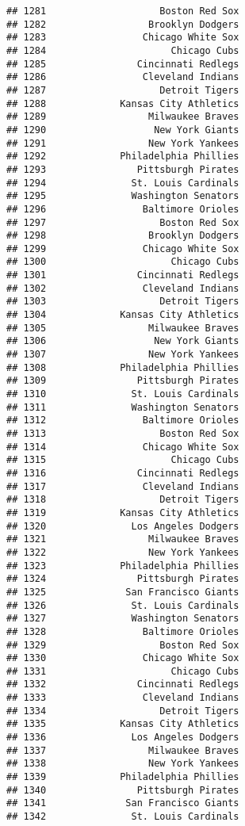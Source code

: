 \documentclass[]{article}
\begin{document}
\begin{verbatim}
## 1281                    Boston Red Sox
## 1282                  Brooklyn Dodgers
## 1283                 Chicago White Sox
## 1284                      Chicago Cubs
## 1285                Cincinnati Redlegs
## 1286                 Cleveland Indians
## 1287                    Detroit Tigers
## 1288             Kansas City Athletics
## 1289                  Milwaukee Braves
## 1290                   New York Giants
## 1291                  New York Yankees
## 1292             Philadelphia Phillies
## 1293                Pittsburgh Pirates
## 1294               St. Louis Cardinals
## 1295               Washington Senators
## 1296                 Baltimore Orioles
## 1297                    Boston Red Sox
## 1298                  Brooklyn Dodgers
## 1299                 Chicago White Sox
## 1300                      Chicago Cubs
## 1301                Cincinnati Redlegs
## 1302                 Cleveland Indians
## 1303                    Detroit Tigers
## 1304             Kansas City Athletics
## 1305                  Milwaukee Braves
## 1306                   New York Giants
## 1307                  New York Yankees
## 1308             Philadelphia Phillies
## 1309                Pittsburgh Pirates
## 1310               St. Louis Cardinals
## 1311               Washington Senators
## 1312                 Baltimore Orioles
## 1313                    Boston Red Sox
## 1314                 Chicago White Sox
## 1315                      Chicago Cubs
## 1316                Cincinnati Redlegs
## 1317                 Cleveland Indians
## 1318                    Detroit Tigers
## 1319             Kansas City Athletics
## 1320               Los Angeles Dodgers
## 1321                  Milwaukee Braves
## 1322                  New York Yankees
## 1323             Philadelphia Phillies
## 1324                Pittsburgh Pirates
## 1325              San Francisco Giants
## 1326               St. Louis Cardinals
## 1327               Washington Senators
## 1328                 Baltimore Orioles
## 1329                    Boston Red Sox
## 1330                 Chicago White Sox
## 1331                      Chicago Cubs
## 1332                Cincinnati Redlegs
## 1333                 Cleveland Indians
## 1334                    Detroit Tigers
## 1335             Kansas City Athletics
## 1336               Los Angeles Dodgers
## 1337                  Milwaukee Braves
## 1338                  New York Yankees
## 1339             Philadelphia Phillies
## 1340                Pittsburgh Pirates
## 1341              San Francisco Giants
## 1342               St. Louis Cardinals

\end{verbatim}
\end{document}
